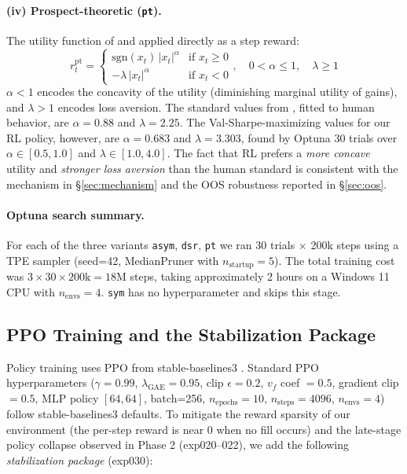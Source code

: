 \documentclass[11pt, a4paper]{article}
\begin{document}
\paragraph{(iv) Prospect-theoretic (\texttt{pt}).}
The utility function of \citet{kahneman1979prospect} and
\citet{tversky1992cumulative} applied directly as a step reward:
\begin{equation}
r_t^{\mathrm{pt}} =
\begin{cases}
\mathrm{sgn}(x_t) \, |x_t|^{\alpha} & \text{if } x_t \geq 0 \\
-\lambda \, |x_t|^{\alpha} & \text{if } x_t < 0
\end{cases}, \quad 0 < \alpha \leq 1, \quad \lambda \geq 1
\end{equation}
$\alpha < 1$ encodes the concavity of the utility (diminishing marginal
utility of gains), and $\lambda > 1$ encodes loss aversion. The standard
values from \citet{tversky1992cumulative}, fitted to human behavior, are
$\alpha = 0.88$ and $\lambda = 2.25$. The Val-Sharpe-maximizing values for our
RL policy, however, are $\alpha = 0.683$ and $\lambda = 3.303$, found by
Optuna 30 trials over $\alpha \in [0.5, 1.0]$ and $\lambda \in [1.0, 4.0]$.
The fact that RL prefers a \emph{more concave} utility and \emph{stronger
loss aversion} than the human standard is consistent with the mechanism in
\S\ref{sec:mechanism} and the OOS robustness reported in \S\ref{sec:oos}.

\paragraph{Optuna search summary.}
For each of the three variants \texttt{asym}, \texttt{dsr}, \texttt{pt} we ran
30 trials $\times$ 200k steps using a TPE sampler
\citep{akiba2019optuna} (seed=42, MedianPruner with
$n_{\text{startup}}=5$). The total training cost was $3 \times 30 \times
200\text{k} = 18$M steps, taking approximately 2 hours on a Windows 11
CPU with $n_{\text{envs}}=4$. \texttt{sym} has no hyperparameter and skips
this stage.

\subsection{PPO Training and the Stabilization Package}
\label{sec:ppo_stab}

Policy training uses PPO \citep{schulman2017ppo} from stable-baselines3
\citep{raffin2021sb3}. Standard PPO hyperparameters
($\gamma=0.99$, $\lambda_{\mathrm{GAE}}=0.95$, clip
$\epsilon=0.2$, $v_f$ coef $=0.5$, gradient clip $=0.5$, MLP policy
$[64, 64]$, batch=256, $n_{\text{epochs}}=10$, $n_{\text{steps}}=4096$,
$n_{\text{envs}}=4$) follow stable-baselines3 defaults. To mitigate the
reward sparsity of our environment (the per-step reward is near 0 when no
fill occurs) and the late-stage policy collapse observed in Phase 2
(exp020--022), we add the following \emph{stabilization package} (exp030):
\end{document}
